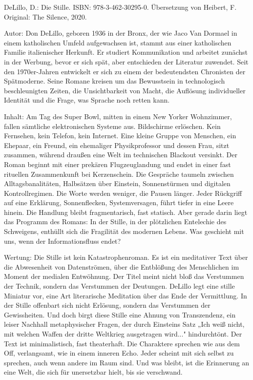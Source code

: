 \documentclass[
  ngerman,
]{article}
\begin{document}
DeLillo, D.: Die Stille. ISBN: 978-3-462-30295-0. Übersetzung von
Heibert, F. Original: The Silence, 2020.

Autor: Don DeLillo, geboren 1936 in der Bronx, der wie Jaco Van Dormael
in einem katholischen Umfeld aufgewachsen ist, stammt aus einer
katholischen Familie italienischer Herkunft. Er studiert Kommunikation
und arbeitet zunächst in der Werbung, bevor er sich spät, aber
entschieden der Literatur zuwendet. Seit den 1970er-Jahren entwickelt er
sich zu einem der bedeutendsten Chronisten der Spätmoderne. Seine Romane
kreisen um das Bewusstsein in technologisch beschleunigten Zeiten, die
Unsichtbarkeit von Macht, die Auflösung individueller Identität und die
Frage, was Sprache noch retten kann.

Inhalt: Am Tag des Super Bowl, mitten in einem New Yorker Wohnzimmer,
fallen sämtliche elektronischen Systeme aus. Bildschirme erlöschen. Kein
Fernsehen, kein Telefon, kein Internet. Eine kleine Gruppe von Menschen,
ein Ehepaar, ein Freund, ein ehemaliger Physikprofessor und dessen Frau,
sitzt zusammen, während draußen eine Welt im technischen Blackout
versinkt. Der Roman beginnt mit einer prekären Flugzeuglandung und endet
in einer fast rituellen Zusammenkunft bei Kerzenschein. Die Gespräche
taumeln zwischen Alltagsbanalitäten, Halbsätzen über Einstein,
Sonnenstürmen und digitalen Kontrollregimen. Die Worte werden weniger,
die Pausen länger. Jeder Rückgriff auf eine Erklärung, Sonnenflecken,
Systemversagen, führt tiefer in eine Leere hinein. Die Handlung bleibt
fragmentarisch, fast statisch. Aber gerade darin liegt das Programm des
Romans: In der Stille, in der plötzlichen Entelechie des Schweigens,
enthüllt sich die Fragilität des modernen Lebens. Was geschieht mit uns,
wenn der Informationsfluss endet?

Wertung: Die Stille ist kein Katastrophenroman. Es ist ein meditativer
Text über die Abwesenheit von Datenströmen, über die Entblößung des
Menschlichen im Moment der medialen Entwöhnung. Der Titel meint nicht
bloß das Verstummen der Technik, sondern das Verstummen der Deutungen.
DeLillo legt eine stille Miniatur vor, eine Art literarische Meditation
über das Ende der Vermittlung. In der Stille offenbart sich nicht
Erlösung, sondern das Verstummen der Gewissheiten. Und doch birgt diese
Stille eine Ahnung von Transzendenz, ein leiser Nachhall metaphysischer
Fragen, der durch Einsteins Satz „Ich weiß nicht, mit welchen Waffen der
dritte Weltkrieg ausgetragen wird..." hindurchtönt. Der Text ist
minimalistisch, fast theaterhaft. Die Charaktere sprechen wie aus dem
Off, verlangsamt, wie in einem inneren Echo. Jeder scheint mit sich
selbst zu sprechen, auch wenn andere im Raum sind. Und was bleibt, ist
die Erinnerung an eine Welt, die sich für unersetzbar hielt, bis sie
verschwand.
\end{document}
